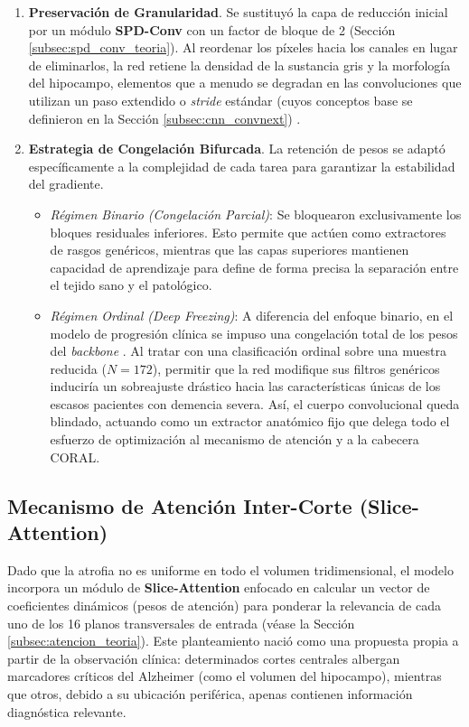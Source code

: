 \documentclass[12pt, oneside, english, spanish]{book}
\begin{document}
\begin{enumerate}
	\item \textbf{Preservación de Granularidad}. Se sustituyó la capa de reducción inicial por un módulo \textbf{SPD-Conv} con un factor de bloque de 2 (Sección \ref{subsec:spd_conv_teoria}). Al reordenar los píxeles hacia los canales en lugar de eliminarlos, la red retiene la densidad de la sustancia gris y la morfología del hipocampo, elementos que a menudo se degradan en las convoluciones que utilizan un paso extendido o \textit{stride} estándar (cuyos conceptos base se definieron en la Sección \ref{subsec:cnn_convnext}) \cite{sikiric2022no}.
	
	\item \textbf{Estrategia de Congelación Bifurcada}. La retención de pesos se adaptó específicamente a la complejidad de cada tarea para garantizar la estabilidad del gradiente.
	\begin{itemize}
		\item \textit{Régimen Binario (Congelación Parcial)}: Se bloquearon exclusivamente los bloques residuales inferiores. Esto permite que actúen como extractores de rasgos genéricos, mientras que las capas superiores mantienen capacidad de aprendizaje para define de forma precisa la separación entre el tejido sano y el patológico.
		
		\item \textit{Régimen Ordinal (Deep Freezing)}: A diferencia del enfoque binario, en el modelo de progresión clínica se impuso una congelación total de los pesos del \textit{backbone} \cite{liu2022convnet}. Al tratar con una clasificación ordinal sobre una muestra reducida ($N = 172$), permitir que la red modifique sus filtros genéricos induciría un sobreajuste drástico hacia las características únicas de los escasos pacientes con demencia severa. Así, el cuerpo convolucional queda blindado, actuando como un extractor anatómico fijo que delega todo el esfuerzo de optimización al mecanismo de atención y a la cabecera CORAL.
	\end{itemize}
\end{enumerate}

\subsection{Mecanismo de Atención Inter-Corte (Slice-Attention)} \label{subsec:diseno_slice_attention}

Dado que la atrofia no es uniforme en todo el volumen tridimensional, el modelo incorpora un módulo de \textbf{Slice-Attention} enfocado en calcular un vector de coeficientes dinámicos (pesos de atención) para ponderar la relevancia de cada uno de los 16 planos transversales de entrada (véase la Sección \ref{subsec:atencion_teoria}). Este planteamiento nació como una propuesta propia a partir de la observación clínica: determinados cortes centrales albergan marcadores críticos del Alzheimer (como el volumen del hipocampo), mientras que otros, debido a su ubicación periférica, apenas contienen información diagnóstica relevante. 
\end{document}
